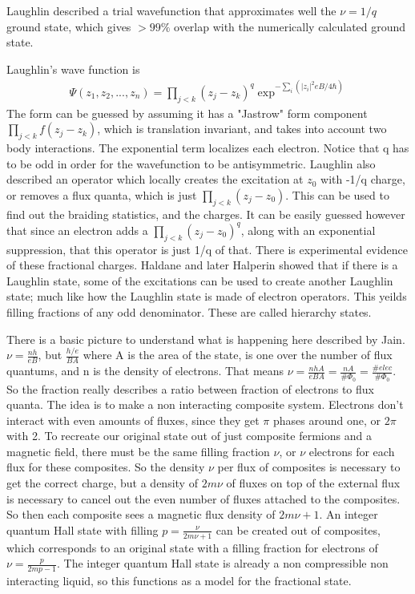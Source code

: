 Laughlin described a trial wavefunction that approximates well the $\nu = 1/q$ ground state, which gives $> 99\%$ overlap with the numerically calculated ground state.

Laughlin's wave function is 
\begin{align}
\Psi(z_1,z_2,...,z_n) = \prod_{j<k}(z_j-z_k)^q \exp^{-\sum_i(|z_i|^2eB/4\hbar)}
\end{align} 
The form can be guessed by assuming it has a "Jastrow" form component $\prod_{j<k}f(z_j-z_k)$, which is translation invariant, and takes into account two body interactions. The exponential term localizes each electron. Notice that q has to be odd in order for the wavefunction to be antisymmetric. Laughlin also described an operator which locally creates the excitation at $z_0$ with -1/q charge, or removes a flux quanta, which is just $\prod_{j<k}(z_j-z_0)$. This can be used to find out the braiding statistics, and the charges. It can be easily guessed however that since an electron adds a  $\prod_{j<k}(z_j-z_0)^q$, along with an exponential suppression, that this operator is just 1/q of that. There is experimental evidence of these fractional charges\cite{1997Natur.389..162D}. Haldane and later Halperin showed that if there is a Laughlin state, some of the excitations can be used to create another Laughlin state; much like how the Laughlin state is made of electron operators. This yeilds filling fractions of any odd denominator. These are called hierarchy states. 

There is a basic picture to understand what is happening here described by Jain. $\nu = \frac{nh}{eB}$, but $\frac{h/e}{BA}$ where A is the area of the state, is one over the number of flux quantums, and n is the density of electrons. That means $\nu = \frac{nhA}{eBA} = \frac{nA}{\#\Phi_0} = \frac{\#elec}{\#\Phi_0}$. So the fraction really describes a ratio between fraction of electrons to flux quanta. The idea is to make a non interacting composite system. Electrons don't interact with even amounts of fluxes, since they get $\pi$ phases around one, or $2\pi$ with 2. To recreate our original state out of just composite fermions and a magnetic field, there must be the same filling fraction $\nu$, or $\nu$ electrons for each flux for these composites. So the density $\nu$ per flux of composites is necessary to get the correct charge, but a density of $2m\nu$ of fluxes on top of the external flux is necessary to cancel out the even number of fluxes attached to the composites. So then each composite sees a magnetic flux density of $2m\nu+1$. An integer quantum Hall state with filling $p = \frac{\nu}{2m\nu+1}$ can be created out of composites, which corresponds to an original state with a filling fraction for electrons of $\nu = \frac{p}{2mp-1}$. The integer quantum Hall state is already a non compressible non interacting liquid, so this functions as a model for the fractional state. 

